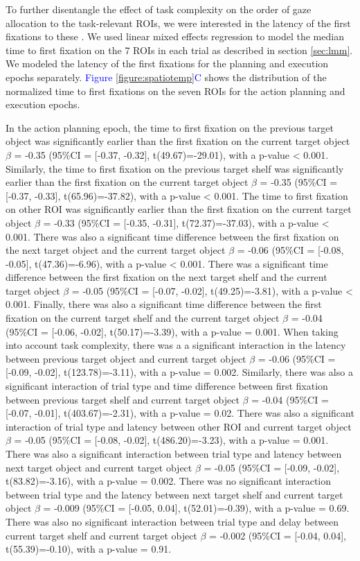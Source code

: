 To further disentangle the effect of task complexity on the order of gaze allocation to the task-relevant ROIs, we were interested in the latency of the first fixations to these . We used linear mixed effects regression to model the median time to first fixation on the 7 ROIs in each trial as described in section \ref{sec:lmm}. We modeled the latency of the first fixations for the planning and execution epochs separately. \textcolor{Blue}{Figure \ref{figure:spatiotemp}C} shows the distribution of the normalized time to first fixations on the seven ROIs for the action planning and execution epochs. 

In the action planning epoch, the time to first fixation on the previous target object was significantly earlier than the first fixation on the current target object $\beta$ = -0.35 (95\%CI = [-0.37, -0.32], t(49.67)=-29.01), with a p-value < 0.001. Similarly, the time to first fixation on the previous target shelf was significantly earlier than the first fixation on the current target object $\beta$ = -0.35 (95\%CI = [-0.37, -0.33], t(65.96)=-37.82), with a p-value < 0.001. The time to first fixation on other ROI was significantly earlier than the first fixation on the current target object $\beta$ = -0.33 (95\%CI = [-0.35, -0.31], t(72.37)=-37.03), with a p-value < 0.001. There was also a significant time difference between the first fixation on the next target object and the current target object $\beta$ = -0.06 (95\%CI = [-0.08, -0.05], t(47.36)=-6.96), with a p-value < 0.001. There was a significant time difference between the first fixation on the next target shelf and the current target object $\beta$ = -0.05 (95\%CI = [-0.07, -0.02], t(49.25)=-3.81), with a p-value < 0.001. Finally, there was also a significant time difference between the first fixation on the current target shelf and the current target object $\beta$ = -0.04 (95\%CI = [-0.06, -0.02], t(50.17)=-3.39), with a p-value = 0.001. When taking into account task complexity, there was a a significant interaction in the latency between previous target object and current target object $\beta$ = -0.06 (95\%CI = [-0.09, -0.02], t(123.78)=-3.11), with a p-value = 0.002. Similarly, there was also a significant interaction of trial type and time difference between first fixation between previous target shelf and current target object $\beta$ = -0.04 (95\%CI = [-0.07, -0.01], t(403.67)=-2.31), with a p-value = 0.02. There was also a significant interaction of trial type and latency between other ROI and current target object $\beta$ = -0.05 (95\%CI = [-0.08, -0.02], t(486.20)=-3.23), with a p-value = 0.001. There was also a significant interaction between trial type and latency between next target object and current target object $\beta$ = -0.05 (95\%CI = [-0.09, -0.02], t(83.82)=-3.16), with a p-value = 0.002. There was no significant interaction between trial type and the latency between next target shelf and current target object $\beta$ = -0.009 (95\%CI = [-0.05, 0.04], t(52.01)=-0.39), with a p-value = 0.69. There was also no significant interaction between trial type and delay between current target shelf and current target object $\beta$ = -0.002 (95\%CI = [-0.04, 0.04], t(55.39)=-0.10), with a p-value = 0.91.

